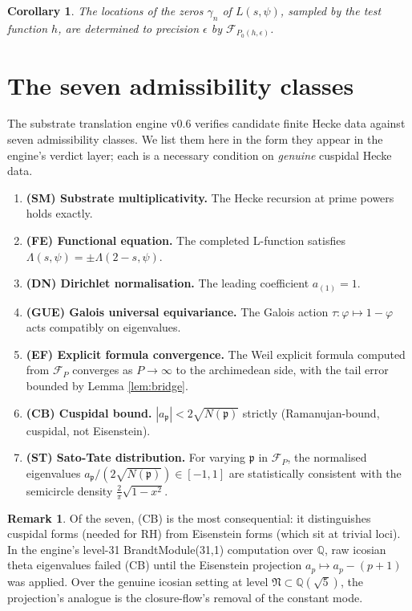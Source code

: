 \documentclass[11pt,a4paper]{article}
\newtheorem{corollary}[theorem]{Corollary}
\theoremstyle{definition}
\newtheorem{remark}[theorem]{Remark}
\newcommand{\Q}{\mathbb{Q}}
\begin{document}
\begin{corollary}\label{cor:zeros-from-tiling}
The locations of the zeros $\gamma_n$ of $L(s,\psi)$, sampled by the test
function $h$, are determined to precision $\epsilon$ by $\mathcal{F}_{P_0(h,\epsilon)}$.
\end{corollary}

\section{The seven admissibility classes}\label{sec:admissibility}

The substrate translation engine v0.6 \cite{TranslationEngine} verifies
candidate finite Hecke data against seven admissibility classes. We list them
here in the form they appear in the engine's verdict layer; each is a
necessary condition on \emph{genuine} cuspidal Hecke data.

\begin{enumerate}[label=(A\arabic*)]
\item \textbf{(SM) Substrate multiplicativity.} The Hecke recursion at prime
      powers holds exactly.
\item \textbf{(FE) Functional equation.} The completed L-function satisfies
      $\Lambda(s,\psi) = \pm\Lambda(2-s,\psi)$.
\item \textbf{(DN) Dirichlet normalisation.} The leading coefficient
      $a_{(1)}=1$.
\item \textbf{(GUE) Galois universal equivariance.} The Galois action
      $\tau\colon\varphi\mapsto 1-\varphi$ acts compatibly on eigenvalues.
\item \textbf{(EF) Explicit formula convergence.} The Weil explicit formula
      computed from $\mathcal{F}_P$ converges as $P\to\infty$ to the
      archimedean side, with the tail error bounded by Lemma \ref{lem:bridge}.
\item \textbf{(CB) Cuspidal bound.} $|a_\mathfrak{p}| < 2\sqrt{N(\mathfrak{p})}$
      strictly (Ramanujan-bound, cuspidal, not Eisenstein).
\item \textbf{(ST) Sato-Tate distribution.} For varying $\mathfrak{p}$ in
      $\mathcal{F}_P$, the normalised eigenvalues
      $a_\mathfrak{p}/(2\sqrt{N(\mathfrak{p})})\in[-1,1]$ are statistically
      consistent with the semicircle density $\frac{2}{\pi}\sqrt{1-x^2}$.
\end{enumerate}

\begin{remark}
Of the seven, (CB) is the most consequential: it distinguishes cuspidal forms
(needed for RH) from Eisenstein forms (which sit at trivial loci). In the
engine's level-31 BrandtModule(31,1) computation over $\Q$, raw icosian theta
eigenvalues failed (CB) until the Eisenstein projection $a_p\mapsto a_p - (p+1)$
was applied. Over the genuine icosian setting at level $\mathfrak{N}\subset\Q(\sqrt{5})$,
the projection's analogue is the closure-flow's removal of the constant mode.
\end{remark}
\end{document}
